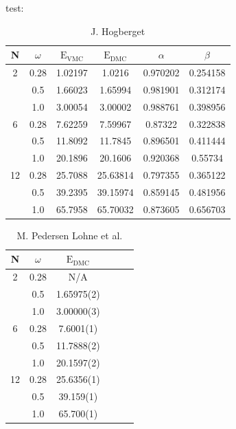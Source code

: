 test:
\newpage
\begin{table}
\begin{center}
\label{tab:DMCRes}
\begin{tabular}{cc|cccc}
    N     & $\omega$ & $\mathrm{E_{VMC}}$ & $\mathrm{E_{DMC}}$ & $\alpha$ & $\beta$  \\
\hline
    2     &   0.28   & 1.02197  &  1.0216  & 0.970202 & 0.254158 \\
          &   0.5    & 1.66023  & 1.65994  & 0.981901 & 0.312174 \\
          &   1.0    & 3.00054  & 3.00002  & 0.988761 & 0.398956 \\
    6     &   0.28   & 7.62259  & 7.59967  & 0.87322  & 0.322838 \\
          &   0.5    & 11.8092  & 11.7845  & 0.896501 & 0.411444 \\
          &   1.0    & 20.1896  & 20.1606  & 0.920368 & 0.55734  \\
    12    &   0.28   & 25.7088  & 25.63814 & 0.797355 & 0.365122 \\
          &   0.5    & 39.2395  & 39.15974 & 0.859145 & 0.481956 \\
          &   1.0    & 65.7958  & 65.70032 & 0.873605 & 0.656703 \\
\end{tabular}
\caption{J. Hogberget}
\end{center}
\end{table}

\begin{table}
\begin{center}
\label{tab:LohneRes}
\begin{tabular}{cc|cccc}
    N     & $\omega$ & $\mathrm{E_{DMC}}$  \\
\hline
    2     &   0.28   &  N/A     \\
          &   0.5    & 1.65975(2)  \\
          &   1.0    &  3.00000(3) \\
    6     &   0.28   &   7.6001(1) \\
          &   0.5    &  11.7888(2) \\
          &   1.0    &  20.1597(2) \\
    12    &   0.28   &  25.6356(1) \\
          &   0.5    &  39.159(1)  \\
          &   1.0    &  65.700(1)  \\
\end{tabular}
\caption{M. Pedersen Lohne et al.}
\end{center}
\end{table}

